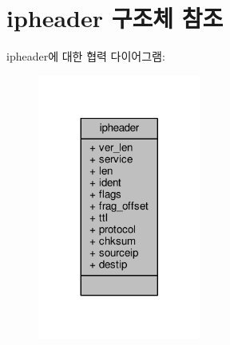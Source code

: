 \hypertarget{structavdecc__lib_1_1ipheader}{}\section{ipheader 구조체 참조}
\label{structavdecc__lib_1_1ipheader}


ipheader에 대한 협력 다이어그램\+:
\nopagebreak
\begin{figure}[H]
\begin{center}
\leavevmode
\includegraphics[width=152pt]{structavdecc__lib_1_1ipheader__coll__graph}
\end{center}
\end{figure}
